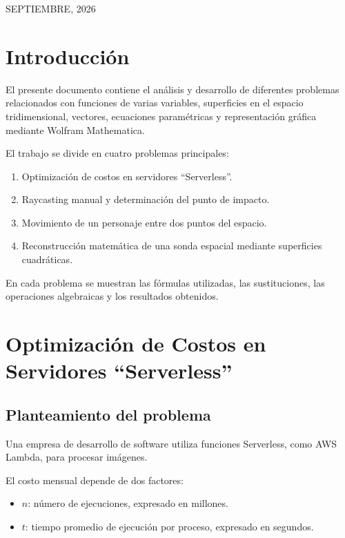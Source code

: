\documentclass[12pt,a4paper]{article}
\begin{document}
\vfill
\begin{flushright}
{\small SEPTIEMBRE, 2026}
\end{flushright}

\newpage

\section{Introducción}

El presente documento contiene el análisis y desarrollo de diferentes
problemas relacionados con funciones de varias variables, superficies
en el espacio tridimensional, vectores, ecuaciones paramétricas y
representación gráfica mediante Wolfram Mathematica.

El trabajo se divide en cuatro problemas principales:

\begin{enumerate}
    \item Optimización de costos en servidores ``Serverless''.
    \item Raycasting manual y determinación del punto de impacto.
    \item Movimiento de un personaje entre dos puntos del espacio.
    \item Reconstrucción matemática de una sonda espacial mediante
    superficies cuadráticas.
\end{enumerate}

En cada problema se muestran las fórmulas utilizadas, las sustituciones,
las operaciones algebraicas y los resultados obtenidos.


\section{Optimización de Costos en Servidores ``Serverless''}

\subsection{Planteamiento del problema}

Una empresa de desarrollo de software utiliza funciones Serverless,
como AWS Lambda, para procesar imágenes.

El costo mensual depende de dos factores:

\begin{itemize}
    \item $n$: número de ejecuciones, expresado en millones.
    \item $t$: tiempo promedio de ejecución por proceso, expresado en segundos.
\end{itemize}
\end{document}
